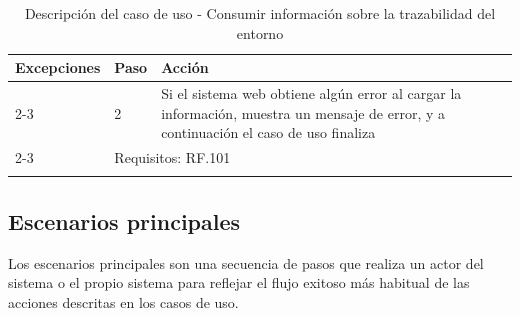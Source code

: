 \documentclass[12pt,a4paper, twoside]{report}
\begin{document}
\begin{longtable}{|p{3cm}|p{1cm}|p{12.5cm}|}
		\multirow{0}{3cm}{\cellcolor{Gainsboro}\textbf{Excepciones}} & \textbf{Paso} & \textbf{Acción} \\ \cline{2-3} 
		\cellcolor{Gainsboro} & 2 & Si el sistema web obtiene algún error al cargar la información, muestra un mensaje de error, y a continuación el caso de uso finaliza	\\ \cline{2-3} 
						
		\multicolumn{1}{|>{\columncolor{Gainsboro}}p{3cm}|}{\textbf{Comentarios}} & \multicolumn{2}{p{13.5cm}|}{Requisitos: RF.101} \\ \hline
		\caption{Descripción del caso de uso - Consumir información sobre la trazabilidad del entorno}
	\end{longtable}
	
	\subsection{Escenarios principales}
		
	Los escenarios principales son una secuencia de pasos que realiza un actor del sistema o el propio sistema para reflejar el flujo exitoso más habitual de las acciones descritas en los casos de uso.
	
\end{document}
